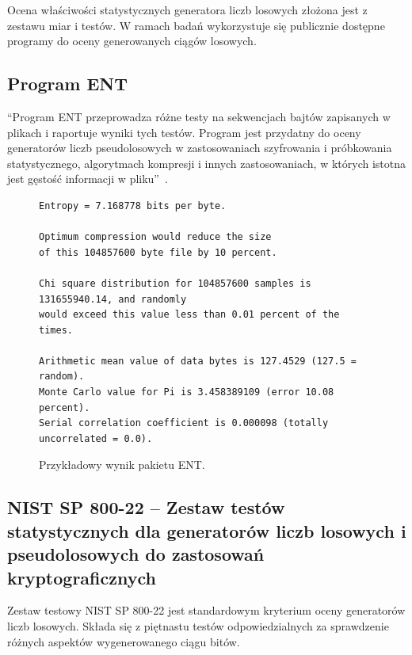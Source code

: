 \noindent Ocena właściwości statystycznych generatora liczb losowych złożona jest z 
zestawu miar i testów. W ramach badań wykorzystuje się publicznie dostępne 
programy do oceny generowanych ciągów losowych. 


\subsection{Program ENT}

\noindent \enquote{Program ENT przeprowadza różne testy 
na sekwencjach bajtów zapisanych w plikach i raportuje wyniki tych testów. Program jest 
przydatny do oceny generatorów liczb pseudolosowych w zastosowaniach szyfrowania i 
próbkowania statystycznego, algorytmach kompresji i innych zastosowaniach, w których 
istotna jest gęstość informacji w pliku}~\cite{fourmilab-ENT}.

\begin{figure}[H]
    \centering
    \begin{verbatim}
Entropy = 7.168778 bits per byte.

Optimum compression would reduce the size
of this 104857600 byte file by 10 percent.

Chi square distribution for 104857600 samples is 131655940.14, and randomly
would exceed this value less than 0.01 percent of the times.

Arithmetic mean value of data bytes is 127.4529 (127.5 = random).
Monte Carlo value for Pi is 3.458389109 (error 10.08 percent).
Serial correlation coefficient is 0.000098 (totally uncorrelated = 0.0).
    \end{verbatim}
    \caption{Przykładowy wynik pakietu ENT.}
    \label{fig:ch2_wyniki_ent}
\end{figure}


\subsection{NIST SP 800-22 -- Zestaw testów statystycznych dla generatorów liczb 
losowych i pseudolosowych do zastosowań kryptograficznych}

\noindent Zestaw testowy NIST SP 800-22 jest standardowym kryterium oceny 
generatorów liczb losowych. Składa się z piętnastu testów odpowiedzialnych za 
sprawdzenie różnych aspektów wygenerowanego ciągu bitów.

